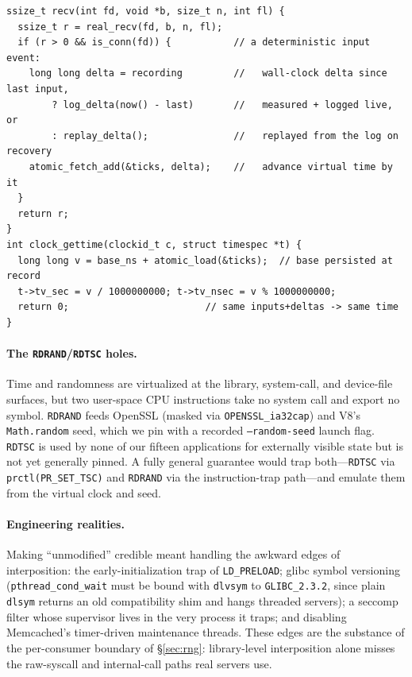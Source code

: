 \begin{lstlisting}[style=cstyle,caption={The virtual clock. At each input
event, time advances by the \emph{real} inter-arrival gap, logged live and
replayed on recovery. Over the fabric, \texttt{delta} is derived from the
message's total-order timestamp rather than measured.},label={lst:vclock},float=ht,
basicstyle=\ttfamily\footnotesize]
ssize_t recv(int fd, void *b, size_t n, int fl) {
  ssize_t r = real_recv(fd, b, n, fl);
  if (r > 0 && is_conn(fd)) {           // a deterministic input event:
    long long delta = recording         //   wall-clock delta since last input,
        ? log_delta(now() - last)       //   measured + logged live, or
        : replay_delta();               //   replayed from the log on recovery
    atomic_fetch_add(&ticks, delta);    //   advance virtual time by it
  }
  return r;
}
int clock_gettime(clockid_t c, struct timespec *t) {
  long long v = base_ns + atomic_load(&ticks);  // base persisted at record
  t->tv_sec = v / 1000000000; t->tv_nsec = v % 1000000000;
  return 0;                        // same inputs+deltas -> same time
}
\end{lstlisting}

\paragraph{The \texttt{RDRAND}/\texttt{RDTSC} holes.} Time and randomness
are virtualized at the library, system-call, and device-file surfaces, but
two user-space CPU instructions take no system call and export no symbol.
\texttt{RDRAND} feeds OpenSSL (masked via \texttt{OPENSSL\_ia32cap}) and
V8's \texttt{Math.random} seed, which we pin with a recorded
\texttt{--random-seed} launch flag. \texttt{RDTSC} is used by none of our
fifteen applications for externally visible state but is not yet generally
pinned. A fully general guarantee would trap both---\texttt{RDTSC} via
\texttt{prctl(PR\_SET\_TSC)} and \texttt{RDRAND} via the instruction-trap
path---and emulate them from the virtual clock and seed.

\paragraph{Engineering realities.} {\sloppy Making ``unmodified'' credible
meant handling the awkward edges of interposition: the early-initialization
trap of \texttt{LD\_PRELOAD}; glibc symbol versioning
(\texttt{pthread\_cond\_wait} must be bound with \texttt{dlvsym} to
\texttt{GLIBC\_2.3.2}, since plain \texttt{dlsym} returns an old
compatibility shim and hangs threaded servers); a seccomp filter whose
supervisor lives in the very process it traps; and disabling Memcached's
timer-driven maintenance threads. These edges are the substance of the
per-consumer boundary of \S\ref{sec:rng}: library-level interposition
alone misses the raw-syscall and internal-call paths real servers use.\par}

